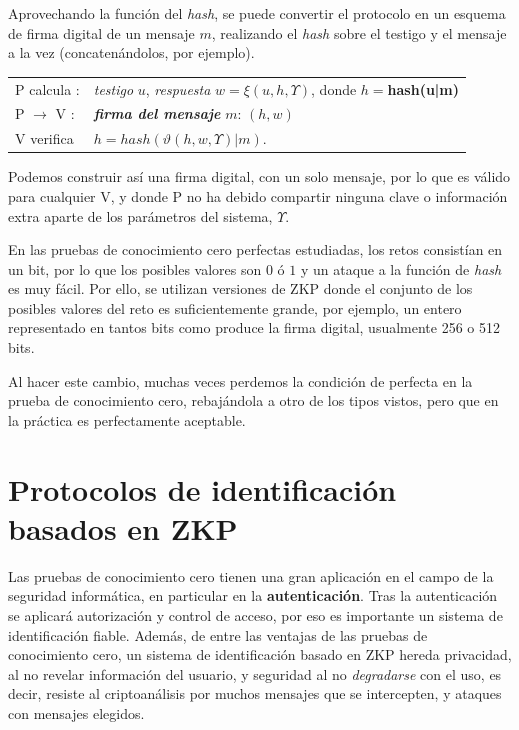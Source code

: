 Aprovechando la función del \textit{hash}, se puede convertir el protocolo en un esquema de firma digital de un mensaje $m$, realizando el \textit{hash} sobre el testigo y el mensaje a la vez (concatenándolos, por ejemplo).


\begin{center}
	\begin{tabular}{ll}\label{fiat-shamir-heur}
		P calcula :& \textit{testigo} $u$, \textit{respuesta} $w = \xi(u, h,\Upsilon)$, donde $h=$\textbf{hash(u|m)}
		\\
		P $\rightarrow$ V :& \textit{\textbf{firma del mensaje}} $m$: \quad $(h,w)$
		\\
		V verifica & $h=hash(\vartheta(h,w,\Upsilon)|m)$.
	\end{tabular}
\end{center}

Podemos construir así una firma digital, con un solo mensaje, por lo que es válido para cualquier V, y donde P no ha debido compartir ninguna clave o información extra aparte de los parámetros del sistema, $\Upsilon$.

\hfil


\begin{remark}
	\hfil
	
	En las pruebas de conocimiento cero perfectas estudiadas, los retos consistían en un bit, por lo que los posibles valores son $0$ ó $1$ y un ataque a la función de \textit{hash} es muy fácil. Por ello, se utilizan versiones de ZKP donde el conjunto de los posibles valores del reto es suficientemente grande, por ejemplo, un entero representado en tantos bits como produce la firma digital, usualmente 256 o 512 bits.
	
	Al hacer este cambio, muchas veces perdemos la condición de perfecta en la prueba de conocimiento cero, rebajándola a otro de los tipos vistos, pero que en la práctica es perfectamente aceptable.
	
\end{remark}








\section{Protocolos de identificación basados en ZKP}


Las pruebas de conocimiento cero tienen una gran aplicación en el campo de la seguridad informática, en particular en la \textbf{autenticación}. Tras la autenticación se aplicará autorización y control de acceso, por eso es importante un sistema de identificación fiable. Además, de entre las ventajas de las pruebas de conocimiento cero, un sistema de identificación basado en ZKP hereda privacidad, al no revelar información del usuario, y seguridad al no \textit{degradarse} con el uso, es decir, resiste al criptoanálisis por muchos mensajes que se intercepten, y ataques con mensajes elegidos. 

